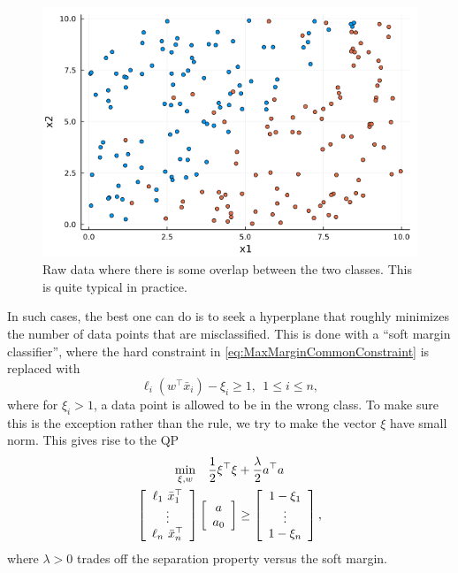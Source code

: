 \begin{figure}[hb!]%
\centering
\includegraphics[width=0.95\columnwidth]{graphics/Chap13SeparatingHyperplanes/SoftMarginData.png}%
\caption[]{Raw data where there is some overlap between the two classes. This is quite typical in practice.}    
\label{fig:soft_margin_01}
\end{figure}

In such cases, the best one can do is to seek a hyperplane that roughly minimizes the number of data points that are misclassified. This is done with a ``soft margin classifier'', where the hard constraint in \eqref{eq:MaxMarginCommonConstraint} is replaced with 
\begin{equation}
\label{eq:SoftMarginCommonConstraint}
       \ell_i(w^\top \bar{x}_i)-\xi_i \geq 1, ~~1 \le i \le n,
\end{equation}
where for $\xi_i >1$, a data point is allowed to be in the wrong class. To make sure this is the exception rather than the rule, we try to make the vector $\xi$ have small norm. This gives rise to the QP
\begin{equation}\begin{aligned}
  \underset{\xi,w}{\rm min  } ~~~ \frac{1}{2} \xi^\top \xi & + \frac{\lambda}{2} a^\top a \\
\left[\begin{array}{c}  \ell_1 ~\bar{x}_1^\top \\ \vdots \\  \ell_n ~\bar{x}_n^\top \end{array} \right] \left[\begin{array}{c} a \\ a_0 \end{array} \right] &\geq \left[\begin{array}{c} 1 -\xi_1 \\ \vdots \\  1 -\xi_n \end{array} \right],
\end{aligned}\end{equation}
where $\lambda >0$ trades off the separation property versus the soft margin.  



